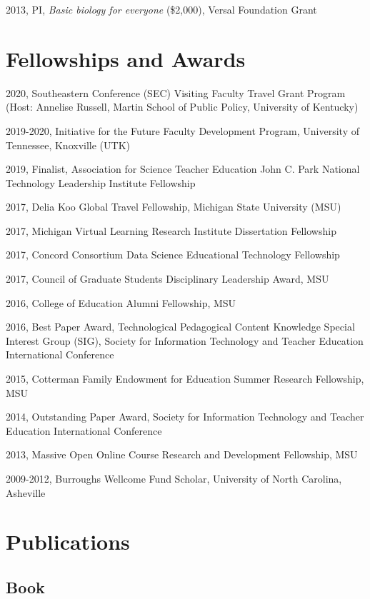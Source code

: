 \documentclass[
  11pt,
]{article}
\begin{document}
2013, PI, \emph{Basic biology for everyone} (\$2,000), Versal Foundation
Grant

\hypertarget{fellowships-and-awards}{%
\section{Fellowships and Awards}\label{fellowships-and-awards}}

2020, Southeastern Conference (SEC) Visiting Faculty Travel Grant
Program (Host: Annelise Russell, Martin School of Public Policy,
University of Kentucky)

2019-2020, Initiative for the Future Faculty Development Program,
University of Tennessee, Knoxville (UTK)

2019, Finalist, Association for Science Teacher Education John C. Park
National Technology Leadership Institute Fellowship

2017, Delia Koo Global Travel Fellowship, Michigan State University
(MSU)

2017, Michigan Virtual Learning Research Institute Dissertation
Fellowship

2017, Concord Consortium Data Science Educational Technology Fellowship

2017, Council of Graduate Students Disciplinary Leadership Award, MSU

2016, College of Education Alumni Fellowship, MSU

2016, Best Paper Award, Technological Pedagogical Content Knowledge
Special Interest Group (SIG), Society for Information Technology and
Teacher Education International Conference

2015, Cotterman Family Endowment for Education Summer Research
Fellowship, MSU

2014, Outstanding Paper Award, Society for Information Technology and
Teacher Education International Conference

2013, Massive Open Online Course Research and Development Fellowship,
MSU

2009-2012, Burroughs Wellcome Fund Scholar, University of North
Carolina, Asheville

\hypertarget{publications}{%
\section{Publications}\label{publications}}

\hypertarget{book}{%
\subsection{Book}\label{book}}
\end{document}
